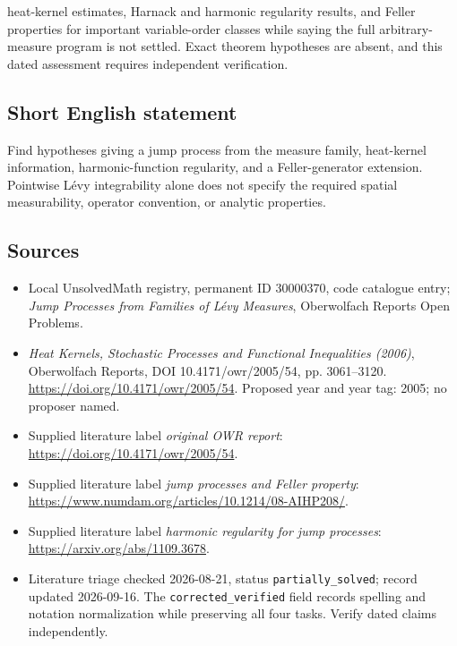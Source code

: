 \documentclass[11pt]{article}
\begin{document}
heat-kernel estimates, Harnack and harmonic regularity results, and Feller properties for important variable-order classes while saying the full arbitrary-measure program is not settled. Exact theorem hypotheses are absent, and this dated assessment requires independent verification.
\subsection{Short English statement}
Find hypotheses giving a jump process from the measure family, heat-kernel information, harmonic-function regularity, and a Feller-generator extension. Pointwise L\'evy integrability alone does not specify the required spatial measurability, operator convention, or analytic properties.
\subsection{Sources}
\begin{itemize}\item Local UnsolvedMath registry, permanent ID 30000370, code catalogue entry; \emph{Jump Processes from Families of L\'evy Measures}, Oberwolfach Reports Open Problems.\item \emph{Heat Kernels, Stochastic Processes and Functional Inequalities (2006)}, Oberwolfach Reports, DOI 10.4171/owr/2005/54, pp. 3061--3120. \url{https://doi.org/10.4171/owr/2005/54}. Proposed year and year tag: 2005; no proposer named.\item Supplied literature label \emph{original OWR report}: \url{https://doi.org/10.4171/owr/2005/54}.\item Supplied literature label \emph{jump processes and Feller property}: \url{https://www.numdam.org/articles/10.1214/08-AIHP208/}.\item Supplied literature label \emph{harmonic regularity for jump processes}: \url{https://arxiv.org/abs/1109.3678}.\item Literature triage checked 2026-08-21, status \texttt{partially\_solved}; record updated 2026-09-16. The \texttt{corrected\_verified} field records spelling and notation normalization while preserving all four tasks. Verify dated claims independently.\end{itemize}
\end{document}
